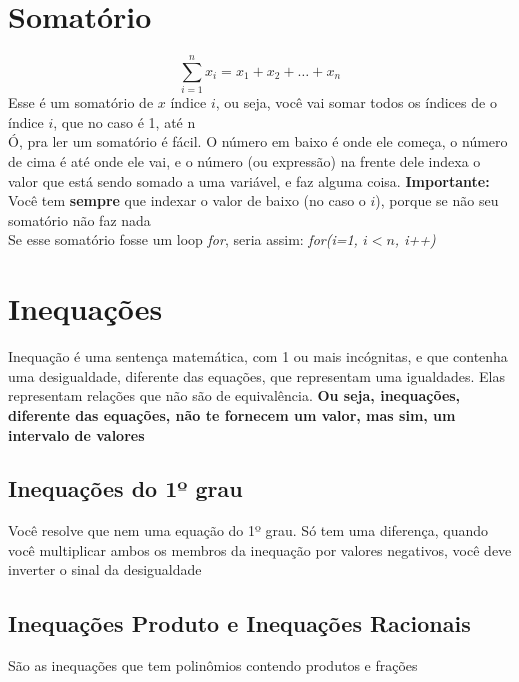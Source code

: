 \documentclass{article}
\begin{document}
\section{Somatório}
\[
\sum_{i=1}^{n} x_i = x_1 + x_2 + \dots + x_n
\]
Esse é um somatório de $x$ índice $i$, ou seja, você vai somar todos os índices de o índice $i$, que no caso é 1, até n
\\[5pt]
Ó, pra ler um somatório é fácil. O número em baixo é onde ele começa, o número de cima é até onde ele vai, e o número (ou expressão) na frente dele indexa o valor que está sendo somado a uma variável, e faz alguma coisa. \textbf{Importante:} Você tem \textbf{sempre} que indexar o valor de baixo (no caso o $i$), porque se não seu somatório não faz nada
\\[5pt]
Se esse somatório fosse um loop \textit{for}, seria assim: \textit{for(i=1, $i < n$, i++)}

\section{Inequações}
Inequação é uma sentença matemática, com 1 ou mais incógnitas, e que contenha uma desigualdade, diferente das equações, que representam uma igualdades. Elas representam relações que não são de equivalência. \textbf{Ou seja, inequações, diferente das equações, não te fornecem um valor, mas sim, um intervalo de valores}

\subsection{Inequações do 1º grau}
Você resolve que nem uma equação do 1º grau. Só tem uma diferença, quando você multiplicar ambos os membros da inequação por valores negativos, você deve inverter o sinal da desigualdade

\subsection{Inequações Produto e Inequações Racionais}
São as inequações que tem polinômios contendo produtos e frações
\end{document}
